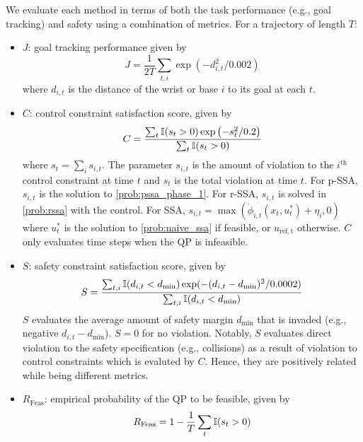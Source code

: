 We evaluate each method in terms of both the task performance (e.g., goal tracking) and safety using a combination of metrics.
For a trajectory of length $T$:
\begin{itemize}
    \item $J$: goal tracking performance given by
        \begin{equation}
            J = \frac{1}{2T}\sum_{t,i}\exp(-d_{i,t}^2 / 0.002)
        \end{equation}
        where $d_{i,t}$ is the distance of the wrist or base $i$ to its goal at each $t$.
        
    \item $C$: control constraint satisfaction score, given by
        \begin{equation}
            C=\frac{\sum_{t}\mathbb{I}(s_t>0)\exp\left(-s_t^2 / 0.2\right)}{\sum_{t}\mathbb{I}(s_t>0)}
        \end{equation}
        where $s_t=\sum_{i}s_{i,t}$. The parameter $s_{i,t}$ is the amount of violation to the $i^\mathrm{th}$ control constraint at time $t$ and $s_t$ is the total violation at time $t$. For p-SSA, $s_{i,t}$ is the solution to \eqref{prob:pssa_phase_1}. For r-SSA, $s_{i,t}$ is solved in \eqref{prob:rssa} with the control. For SSA, $s_{i,t}=\max(\dot{\phi}_{i,t}(x_t,u^*_t)+\eta_{i}, 0)$ where $u^*_t$ is the solution to \eqref{prob:naive_ssa} if feasible, or $u_\mathrm{ref,t}$ otherwise.
        $C$ only evaluates time steps when the QP is infeasible.
        
    \item $S$: safety constraint satisfaction score, given by
        \begin{equation}
            S = \frac{\sum_{t,i}\mathbb{I}(d_{i,t} < d_\mathrm{min})\exp(-(d_{i,t}-d_\mathrm{min})^2 / 0.0002)}{\sum_{t,i}\mathbb{I}(d_{i,t} < d_\mathrm{min})}
        \end{equation}
        $S$ evaluates the average amount of safety margin $d_\mathrm{min}$ that is invaded (e.g., negative $d_{i,t}-d_\mathrm{min}$).
        $S=0$ for no violation.
        Notably, $S$ evaluates direct violation to the safety specification (e.g., collisions) as a result of violation to control constraints which is evaluted by $C$.
        Hence, they are positively related while being different metrics.

    \item $R_\mathrm{Feas}$: empirical probability of the QP to be feasible, given by
        \begin{equation}
            R_\mathrm{Feas} = 1 - \frac{1}{T}\sum_{t}\mathbb{I}(s_t>0)
        \end{equation}
        
\end{itemize}


